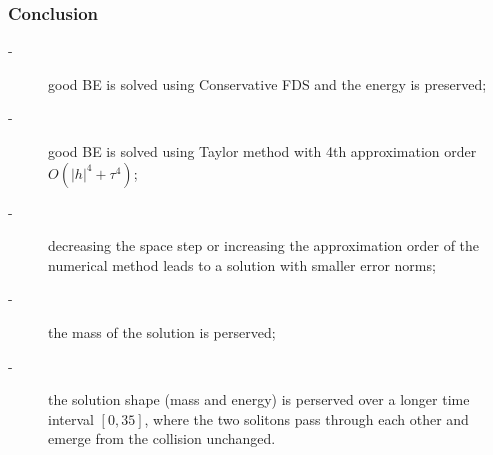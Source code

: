 \documentclass{beamer}
\begin{document}

\begin{frame}
\frametitle{Conclusion}

\begin{description}
 \item[-] good BE is solved using Conservative FDS and the energy is preserved;
 \item[-] good BE is solved using Taylor method with 4th approximation order $O(|h|^4+\tau^4)$;
 \item[-] decreasing the space step or increasing the approximation order of the numerical method leads to a solution with smaller error norms;
 \item[-] the mass of the solution is perserved;
\item[-] the solution shape (mass and energy) is perserved over a longer time interval $[0, 35]$, where the two solitons pass through each other and emerge from the collision unchanged.
\end{description}

\end{frame}

\end{document}
